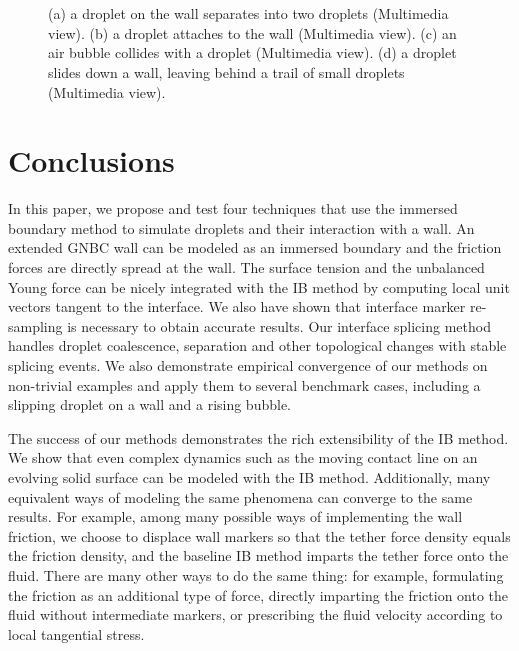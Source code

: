 \documentclass[%
 aip,
 amsmath,amssymb,
 reprint,
 floatfix
]{revtex4-1}
\begin{document}
\begin{figure}
\centering
{}\quad
{}\\
\quad
{}\\
\caption{\footnotesize{(a) a droplet on the wall separates into two droplets (Multimedia view). (b) a droplet attaches to the wall (Multimedia view). (c) an air bubble collides with a droplet (Multimedia view). (d) a droplet slides down a wall, leaving behind a trail of small droplets (Multimedia view).}}
\label{fig:20}
\end{figure}
    

\section{Conclusions} \label{sec:conclusion}
In this paper, we propose and test four techniques that use the immersed boundary method to simulate droplets and their interaction with a wall. An extended GNBC wall can be modeled as an immersed boundary and the friction forces are directly spread at the wall. The surface tension and the unbalanced Young force can be nicely integrated with the IB method by computing local unit vectors tangent to the interface. We also have shown that interface marker re-sampling is necessary to obtain accurate results. Our interface splicing method handles droplet coalescence, separation and other topological changes with stable splicing events. We also demonstrate empirical convergence of our methods on non-trivial examples and apply them to several benchmark cases, including a slipping droplet on a wall and a rising bubble. 


The success of our methods demonstrates the rich extensibility of the IB method. We show that even complex dynamics such as the moving contact line on an evolving solid surface can be modeled with the IB method. Additionally, many equivalent ways of modeling the same phenomena can converge to the same results. For example, among many possible ways of implementing the wall friction, we choose to displace wall markers so that the tether force density equals the friction density, and the baseline IB method imparts the tether force onto the fluid. There are many other ways to do the same thing: for example, formulating the friction as an additional type of force, directly imparting the friction onto the fluid without intermediate markers, or prescribing the fluid velocity according to local tangential stress. 
\end{document}
